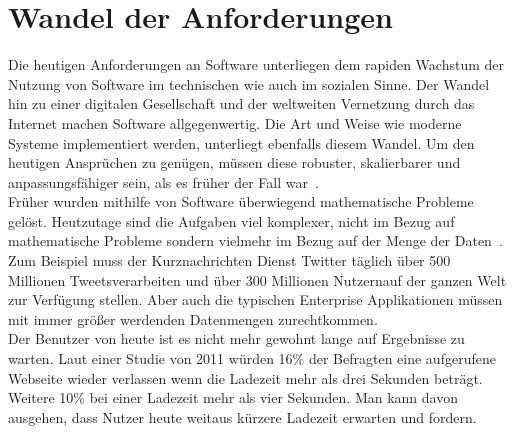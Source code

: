 \section{Wandel der Anforderungen}
Die heutigen Anforderungen an Software unterliegen dem rapiden Wachstum der Nutzung von Software im technischen wie auch im sozialen Sinne. Der Wandel hin zu einer digitalen Gesellschaft und der weltweiten Vernetzung durch das Internet machen Software allgegenwertig. Die Art und Weise wie moderne Systeme implementiert werden, unterliegt ebenfalls diesem Wandel. Um den heutigen Ansprüchen zu genügen, müssen diese robuster, skalierbarer und anpassungsfähiger sein, als es früher der Fall war~\cite{boner_reactive_2014}.\\
Früher wurden mithilfe von Software überwiegend mathematische Probleme gelöst. Heutzutage sind die Aufgaben viel komplexer, nicht im Bezug auf mathematische Probleme sondern vielmehr im Bezug auf der Menge der Daten~\cite[S.~18]{kuhn_reactive_2015}. Zum Beispiel muss der Kurznachrichten Dienst Twitter täglich über 500 Millionen Tweets\footnotemark[1] verarbeiten und über 300 Millionen Nutzern\footnotemark[2] auf der ganzen Welt zur Verfügung stellen. Aber auch die typischen Enterprise Applikationen müssen mit immer größer werdenden Datenmengen zurechtkommen.\\
Der Benutzer von heute ist es nicht mehr gewohnt lange auf Ergebnisse zu warten. Laut einer Studie von 2011 würden 16\% der Befragten eine aufgerufene Webseite wieder verlassen wenn die Ladezeit mehr als drei Sekunden beträgt. Weitere 10\% bei einer Ladezeit mehr als vier Sekunden\footnotemark[3]. Man kann davon ausgehen, dass Nutzer heute weitaus kürzere Ladezeit erwarten und fordern.


